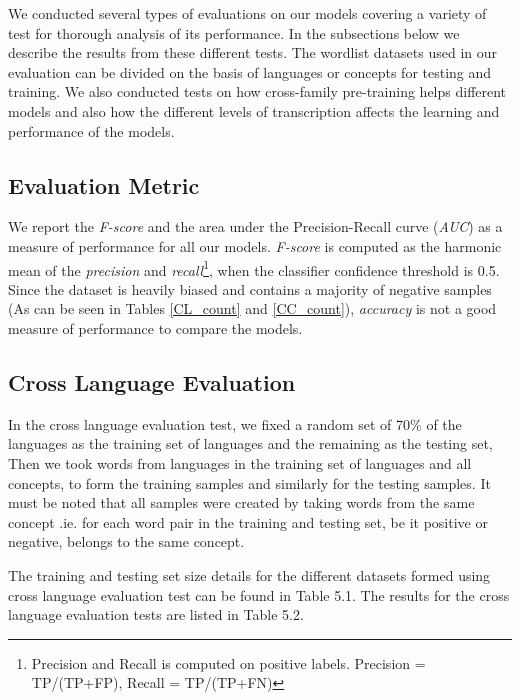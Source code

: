 We conducted several types of evaluations on our models covering a variety of test for thorough analysis of its performance. In the subsections below we describe the results from these different tests.
The wordlist datasets used in our evaluation can be divided on the basis of languages or concepts for testing and training. We also conducted tests on how cross-family pre-training helps different models and also how the different levels of transcription affects the learning and performance of the models.

\subsection{Evaluation Metric}

We report the \textit{F-score} and the area under the Precision-Recall curve (\textit{AUC}) as a measure of performance for all our models. \textit{F-score} is computed as the harmonic mean of the \textit{precision} and \textit{recall}\footnote{Precision and Recall is computed on positive labels. Precision = TP/(TP+FP), Recall = TP/(TP+FN)}, when the classifier confidence threshold is 0.5. Since the dataset is heavily biased and contains a majority of negative samples (As can be seen in Tables \ref{CL_count} and \ref{CC_count}), \textit{accuracy} is not a good measure of performance to compare the models.

\subsection{Cross Language Evaluation}

In the cross language evaluation test, we fixed a random set of 70\% of the languages as the training set of languages and the remaining as the testing set, Then we took words from languages in the training set of languages and all concepts, to form the training samples and similarly for the testing samples. It must be noted that all samples were created by taking words from the same concept .ie. for each word pair in the training and testing set, be it positive or negative, belongs to the same concept.

The training and testing set size details for the different datasets formed using cross language evaluation test can be found in Table 5.1. The results for the cross language evaluation tests are listed in Table 5.2.

